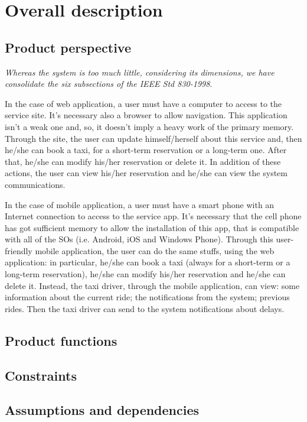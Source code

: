 \section{Overall description}
	\subsection{Product perspective}
		\emph{Whereas the system is too much little, considering its dimensions, we have consolidate the six subsections of the IEEE Std 830-1998}.
		\vspace{10pt}
		
		In the case of web application, a user must have a computer to access to the service site. It's necessary also a browser to allow navigation. This application isn't a weak one and, so, it doesn't imply a heavy work of the primary memory. 
		Through the site, the user can update himself/herself about this service and, then he/she can book a taxi, for a short-term reservation or a long-term one. After that, he/she can modify his/her reservation or delete it. In addition of these actions, the user can view his/her reservation and he/she can view the system communications.
		
		In the case of mobile application, a user must have a smart phone with an Internet connection to access to the service app. It's necessary that the cell phone has got sufficient memory to allow the installation of this app, that is compatible with all of the SOs (i.e. Android, iOS and Windows Phone).
		Through this user-friendly mobile application, the user can do the same stuffs, using the web application: in particular, he/she can book a taxi (always for a short-term or a long-term reservation), he/she can modify his/her reservation and he/she can delete it.
		Instead, the taxi driver, through the mobile application, can view: some information about the current ride; the notifications from the system; previous rides. Then the taxi driver can send to the system notifications about delays.  
	\subsection{Product functions}
	\subsection{Constraints}
	\subsection{Assumptions and dependencies}